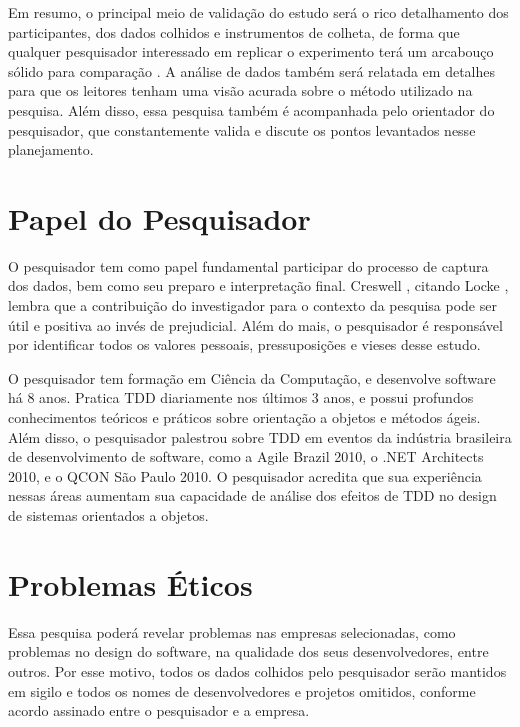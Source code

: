 Em resumo, o principal meio de validação do estudo será o rico detalhamento dos
participantes, dos dados colhidos e instrumentos de colheta, de forma
que qualquer pesquisador interessado em replicar o experimento terá um
arcabouço sólido para comparação \cite{merriam-1988}. A análise de
dados também será relatada em detalhes para que os leitores tenham uma visão
acurada sobre o método utilizado na pesquisa. 
Além disso, essa pesquisa também é acompanhada pelo orientador do pesquisador,
que constantemente valida e discute os pontos levantados nesse planejamento.

\section{Papel do Pesquisador}
\label{sec:planejamento-papel}

O pesquisador tem como papel fundamental participar do processo de captura dos
dados, bem como seu preparo e interpretação final.
Creswell \cite{creswell}, citando Locke \cite{locke}, lembra
que a contribuição do investigador para o contexto da pesquisa pode ser útil e
positiva ao invés de prejudicial. Além do mais, o pesquisador é responsável por
identificar todos os valores pessoais, pressuposições e vieses desse estudo.

O pesquisador tem formação em Ciência da Computação, e desenvolve software há 8
anos. Pratica TDD diariamente nos últimos 3 anos, e possui profundos
conhecimentos teóricos e práticos sobre orientação a objetos e métodos ágeis.
Além disso, o pesquisador palestrou sobre TDD em eventos da indústria brasileira
de desenvolvimento de software, como a Agile Brazil 2010, o .NET Architects
2010, e o QCON São Paulo 2010. O pesquisador acredita que sua experiência nessas
áreas aumentam sua capacidade de análise dos efeitos de TDD no design de sistemas 
orientados a objetos.

\section{Problemas Éticos}
\label{sec:planejamento-etica}

Essa pesquisa poderá revelar problemas nas empresas selecionadas, como problemas
no design do software, na qualidade dos seus desenvolvedores, entre outros. 
Por esse motivo, todos os dados colhidos pelo pesquisador serão mantidos em
sigilo e todos os nomes de desenvolvedores e projetos omitidos, conforme acordo 
assinado entre o pesquisador e a empresa.

